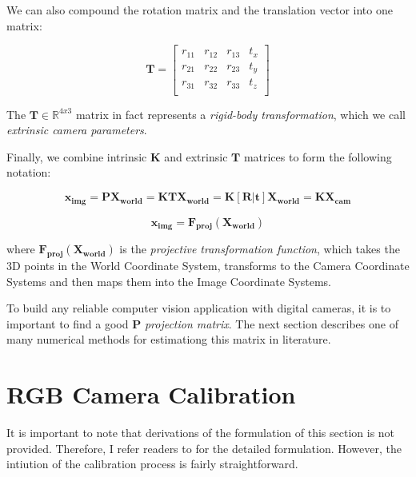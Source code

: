 \documentclass[a4paper]{report}
\numberwithin{figure}{section}
\newcommand{\R}{\mathbb{R}}
\begin{document}
We can also compound the rotation matrix and the translation vector into 
one matrix:

\begin{equation}
  \mathbf{T} =
  \begin{bmatrix}
    r_{11} & r_{12} & r_{13} & t_x\\
    r_{21} & r_{22} & r_{23} & t_y\\
    r_{31} & r_{32} & r_{33} & t_z\\
  \end{bmatrix}
\end{equation} \label{eq:transformation_matrix}

The $\mathbf{T} \in \R^{4x3}$ matrix in fact represents 
a \textit{rigid-body transformation}, which we call 
\textit{extrinsic camera parameters}.

Finally, we combine intrinsic $\mathbf{K}$ and 
extrinsic $\mathbf{T}$ matrices to form the following notation: 

\begin{equation}
  \mathbf{x_{img}} = 
  \mathbf{P}\mathbf{X_{world}} = 
  \mathbf{K}\mathbf{T}\mathbf{X_{world}} = 
  \mathbf{K}[\mathbf{R}|\mathbf{t}]\mathbf{X_{world}} =
  \mathbf{K}\mathbf{X_{cam}}
\end{equation} \label{eq:simplyfied_proj_func_1}

\begin{equation}
  \mathbf{x_{img}} = \mathbf{F_{proj}}(\mathbf{X_{world}})
\end{equation} \label{eq:simplyfied_proj_func_2}

where $\mathbf{F_{proj}}(\mathbf{X_{world}})$ is the 
\textit{projective transformation function}, which takes 
the 3D points in the World Coordinate System, transforms to 
the Camera Coordinate Systems and then maps them into the Image 
Coordinate Systems.

To build any reliable computer vision application with digital cameras, it is 
to important to find a good $\mathbf{P}$ \textit{projection matrix}. 
The next section describes one of many numerical methods for estimationg this 
matrix in literature.

\section{RGB Camera Calibration} \label{sb_sc_rgb_calibration}


It is important to note that derivations of the formulation of this section
is not provided. Therefore, I refer readers to \cite{bla} for the detailed 
formulation. However, the intiution of the calibration process is fairly 
straightforward. 
\end{document}
